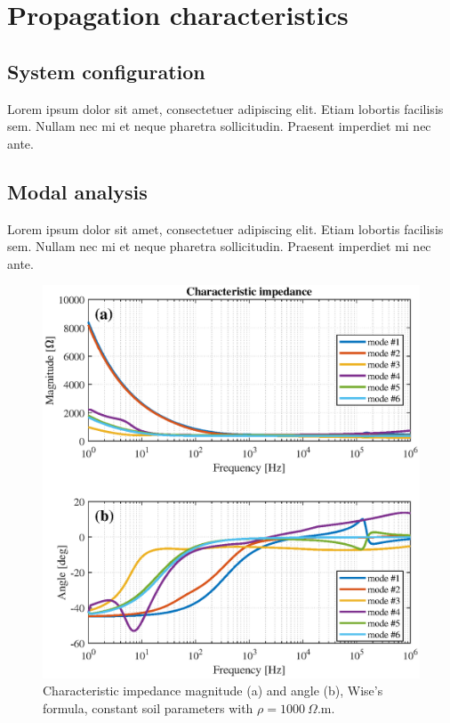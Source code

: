 \documentclass[lettersize,journal]{IEEEtran}
\newcommand*{\shortblindtext}{Lorem ipsum dolor sit amet, consectetuer adipiscing elit. Etiam lobortis facilisis sem. Nullam nec mi et neque pharetra sollicitudin. Praesent imperdiet mi nec ante.}
\begin{document}
\section{Propagation characteristics}

\subsection{System configuration}
\shortblindtext

\subsection{Modal analysis}

\shortblindtext
\begin{figure}[tbh]
	\centering
	\label{fig:CharImped_FD0_Ztot_Wise_Ytot_Wise_rho1000_eps5}
	\includegraphics[width=1\columnwidth]{./fig/CharImped_FD0_Ztot_Wise_Ytot_Wise_rho1000_eps5.eps}
	\caption{Characteristic impedance magnitude (a) and angle (b), Wise's formula, constant soil parameters with $\rho = 1000 \: \Omega$.m.}
\end{figure}
\end{document}
